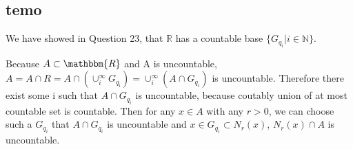 \documentclass{article}
\begin{document}
\subsection{temo}


We have showed in Question 23, that $\mathbb{R}$ has a countable base $\{ G_{q_i} | i  \in \mathbb{N} \} $.

Because $A \subset \mathbbm{R}$ and A is uncountable, $ A = A \cap R = A \cap ( \cup_{i}^{\infty} G_{q_i}) = \cup_{i}^{\infty} (A \cap G_{q_i})$  is uncountable.
Therefore there exist some i such that $A \cap G_{q_i}$ is uncountable, because coutably union of at most countable set is countable.
Then for any $x \in A $ with any $r>0$, we can choose such a $G_{q_i}$ that $A \cap G_{q_i}$ is uncountable and $x \in G_{q_i} \subset N_{r}(x)$, $ N_{r}(x) \cap A $ is uncountable.
\end{document}

